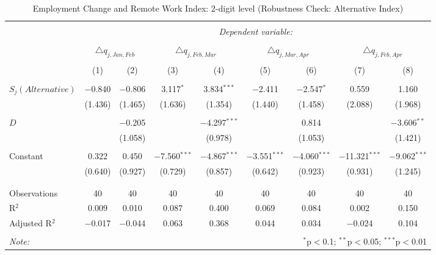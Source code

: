 
\begin{table}[!htbp] \centering 
  \caption{Employment Change and Remote Work Index: 2-digit level (Robustness Check: Alternative Index)} 
  \label{tab:regression_dynamics_2digit_alternative} 
\footnotesize 
\begin{tabular}{@{\extracolsep{5pt}}lcccccccc} 
\\[-1.8ex]\hline 
\hline \\[-1.8ex] 
 & \multicolumn{8}{c}{\textit{Dependent variable:}} \\ 
\cline{2-9} 
\\[-1.8ex] & \multicolumn{2}{c}{$\triangle q_{j,Jan,Feb}$} & \multicolumn{2}{c}{$\triangle q_{j,Feb,Mar}$} & \multicolumn{2}{c}{$\triangle q_{j,Mar,Apr}$} & \multicolumn{2}{c}{$\triangle q_{j,Feb,Apr}$} \\ 
\\[-1.8ex] & (1) & (2) & (3) & (4) & (5) & (6) & (7) & (8)\\ 
\hline \\[-1.8ex] 
 $S_{j} (Alternative)$ & $-$0.840 & $-$0.806 & 3.117$^{*}$ & 3.834$^{***}$ & $-$2.411 & $-$2.547$^{*}$ & 0.559 & 1.160 \\ 
  & (1.436) & (1.465) & (1.636) & (1.354) & (1.440) & (1.458) & (2.088) & (1.968) \\ 
  & & & & & & & & \\ 
 $D$ &  & $-$0.205 &  & $-$4.297$^{***}$ &  & 0.814 &  & $-$3.606$^{**}$ \\ 
  &  & (1.058) &  & (0.978) &  & (1.053) &  & (1.421) \\ 
  & & & & & & & & \\ 
 Constant & 0.322 & 0.450 & $-$7.560$^{***}$ & $-$4.867$^{***}$ & $-$3.551$^{***}$ & $-$4.060$^{***}$ & $-$11.321$^{***}$ & $-$9.062$^{***}$ \\ 
  & (0.640) & (0.927) & (0.729) & (0.857) & (0.642) & (0.923) & (0.931) & (1.245) \\ 
  & & & & & & & & \\ 
\hline \\[-1.8ex] 
Observations & 40 & 40 & 40 & 40 & 40 & 40 & 40 & 40 \\ 
R$^{2}$ & 0.009 & 0.010 & 0.087 & 0.400 & 0.069 & 0.084 & 0.002 & 0.150 \\ 
Adjusted R$^{2}$ & $-$0.017 & $-$0.044 & 0.063 & 0.368 & 0.044 & 0.034 & $-$0.024 & 0.104 \\ 
\hline 
\hline \\[-1.8ex] 
\textit{Note:}  & \multicolumn{8}{r}{$^{*}$p$<$0.1; $^{**}$p$<$0.05; $^{***}$p$<$0.01} \\ 
\end{tabular} 
\end{table} 
